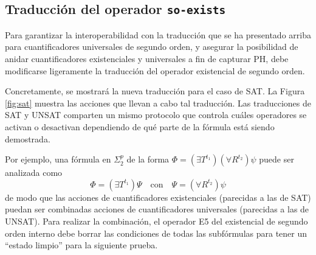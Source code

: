 \subsection{Traducción del operador \texttt{so-exists}}
Para garantizar la interoperabilidad con la traducción que se ha presentado arriba
para cuantificadores universales de segundo orden, y asegurar la posibilidad de anidar
cuantificadores existenciales y universales a fin de capturar PH,
debe modificarse ligeramente la traducción del operador existencial de segundo orden.

Concretamente, se mostrará la nueva traducción para el caso de SAT.
La Figura \ref{fig:sat} muestra las acciones que llevan a
cabo tal traducción.
Las traducciones de SAT y UNSAT comparten un mismo protocolo que controla
cuáles operadores se activan o desactivan dependiendo de qué parte de la
fórmula está siendo demostrada.

Por ejemplo, una fórmula en $\Sigma^p_2$ de la forma
$\Phi=(\exists T^{t_1})(\forall R^{t_2})\psi$ puede ser analizada como
\begin{equation}
\Phi = (\exists T^{t_1})\Psi \quad\text{con}\quad \Psi = (\forall R^{t_2})\psi
\end{equation}
de modo que las acciones de cuantificadores existenciales (parecidas a las de
SAT) puedan ser combinadas acciones de cuantificadores universales (parecidas a
las de UNSAT). Para realizar la combinación, el operador E5 del existencial de
segundo orden interno debe borrar las condiciones de todas las subfórmulas para
tener un ``estado limpio'' para la siguiente prueba.


